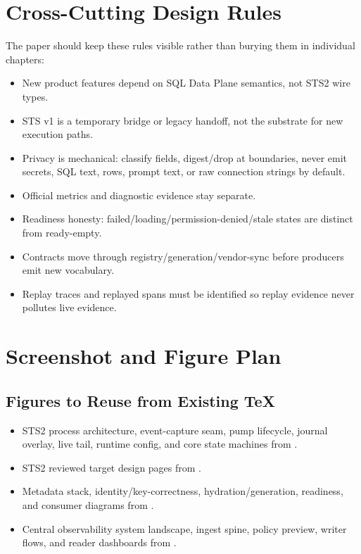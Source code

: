 \documentclass[11pt]{article}
\begin{document}
\section{Cross-Cutting Design Rules}

The paper should keep these rules visible rather than burying them in individual chapters:

\begin{itemize}
	\item New product features depend on SQL Data Plane semantics, not STS2 wire types.
	\item STS v1 is a temporary bridge or legacy handoff, not the substrate for new execution paths.
	\item Privacy is mechanical: classify fields, digest/drop at boundaries, never emit secrets, SQL text, rows, prompt text, or raw connection strings by default.
	\item Official metrics and diagnostic evidence stay separate.
	\item Readiness honesty: failed/loading/permission-denied/stale states are distinct from ready-empty.
	\item Contracts move through registry/generation/vendor-sync before producers emit new vocabulary.
	\item Replay traces and replayed spans must be identified so replay evidence never pollutes live evidence.
\end{itemize}

\section{Screenshot and Figure Plan}

\subsection{Figures to Reuse from Existing TeX}

\begin{itemize}
	\item STS2 process architecture, event-capture seam, pump lifecycle, journal overlay, live tail, runtime config, and core state machines from .
	\item STS2 reviewed target design pages from .
	\item Metadata stack, identity/key-correctness, hydration/generation, readiness, and consumer diagrams from .
	\item Central observability system landscape, ingest spine, policy preview, writer flows, and reader dashboards from .
\end{itemize}
\end{document}
